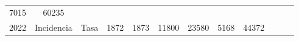 \begin{tabular}{ccc|cccccc|lll}
		\multicolumn{1}{c|}{\cellcolor[HTML]{C1EFC0}7015} &
		\cellcolor[HTML]{C1EFC0}60235 &
		&
		&
		\\ \cline{3-9}
		\multicolumn{1}{|c|}{\multirow{-5}{*}{\cellcolor[HTML]{C1EFC0}2022}} &
		\multicolumn{1}{c|}{\cellcolor[HTML]{C1EFC0}Incidencia} &
		\cellcolor[HTML]{C1EFC0}Tasa &
		\multicolumn{1}{c|}{\cellcolor[HTML]{C1EFC0}1872} &
		\multicolumn{1}{c|}{\cellcolor[HTML]{C1EFC0}1873} &
		\multicolumn{1}{c|}{\cellcolor[HTML]{C1EFC0}11800} &
		\multicolumn{1}{c|}{\cellcolor[HTML]{C1EFC0}23580} &
		\multicolumn{1}{c|}{\cellcolor[HTML]{C1EFC0}5168} &
		\cellcolor[HTML]{C1EFC0}44372 &
		&
		&
		\\ \cline{1-1} \cline{3-9}
	\end{tabular}
